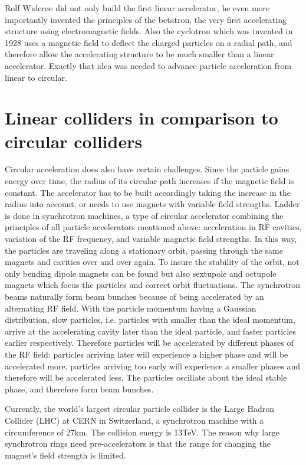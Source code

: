 Rolf Wider\o e did not only build the first linear accelerator, he even more importantly invented the principles of the betatron, the very first accelerating structure using electromagnetic fields.
Also the cyclotron which was invented in 1928 uses a magnetic field to deflect the charged particles on a radial path, and therefore allow the accelerating structure to be much smaller than a linear accelerator.
Exactly that idea was needed to advance particle acceleration from linear to circular.

\section{Linear colliders in comparison to circular colliders}
\label{Linear-Circular}

Circular acceleration does also have certain challenges.
Since the particle gains energy over time, the radius of its circular path increases if the magnetic field is constant.
The accelerator has to be built accordingly taking the increase in the radius into account, or needs to use magnets with variable field strengths.
Ladder is done in synchrotron machines, a type of circular accelerator combining the principles of all particle accelerators mentioned above: acceleration in RF cavities, variation of the RF frequency, and variable magnetic field strengths.
In this way, the particles are traveling along a stationary orbit, passing through the same magnets and cavities over and over again.
To insure the stability of the orbit, not only bending dipole magnets can be found but also sextupole and octupole magnets which focus the particles and correct orbit fluctuations.
The synchrotron beams naturally form beam bunches because of being accelerated by an alternating RF field.
With the particle momentum having a Gaussian distribution, slow particles, i.e. particles with smaller than the ideal momentum, arrive at the accelerating cavity later than the ideal particle, and faster particles earlier respectively.
Therefore particles will be accelerated by different phases of the RF field: particles arriving later will experience a higher phase and will be accelerated more, particles arriving too early will experience a smaller phases and therefore will be accelerated less.
The particles oscillate about the ideal stable phase, and therefore form beam bunches.

Currently, the world's largest circular particle collider is the Large Hadron Collider (LHC) at CERN in Switzerland, a synchrotron machine with a circumference of \unit{27}{km}.
The collision energy is \unit{13}{TeV}.
The reason why large synchrotron rings need pre-accelerators is that the range for changing the magnet's field strength is limited.